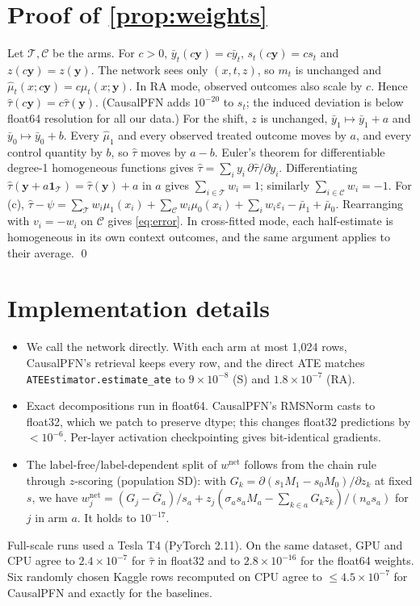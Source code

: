 \documentclass{article}
\newcommand{\that}{\hat\tau}
\begin{document}
\section{Proof of \cref{prop:weights}}\label{app:proof}
Let $\mathcal T, \mathcal C$ be the arms. For $c>0$, $\bar y_t(c\mathbf y) = c\bar y_t$, $s_t(c\mathbf y)=cs_t$ and $z(c\mathbf y)=z(\mathbf y)$. The network sees only $(x,t,z)$, so $m_t$ is unchanged and $\hat\mu_t(x; c\mathbf y) = c\hat\mu_t(x;\mathbf y)$. In RA mode, observed outcomes also scale by $c$. Hence $\that(c\mathbf y)=c\that(\mathbf y)$. (CausalPFN adds $10^{-20}$ to $s_t$; the induced deviation is below float64 resolution for all our data.) For the shift, $z$ is unchanged, $\bar y_1 \mapsto \bar y_1 + a$ and $\bar y_0\mapsto \bar y_0 + b$. Every $\hat\mu_1$ and every observed treated outcome moves by $a$, and every control quantity by $b$, so $\that$ moves by $a-b$. Euler's theorem for differentiable degree-1 homogeneous functions gives $\that = \sum_i y_i\,\partial\that/\partial y_i$. Differentiating $\that(\mathbf y + a\mathbf 1_{\mathcal T}) = \that(\mathbf y) + a$ in $a$ gives $\sum_{i\in\mathcal T}w_i = 1$; similarly $\sum_{i\in\mathcal C} w_i=-1$. For (c), $\that - \psi = \sum_{\mathcal T}w_i\mu_1(x_i) + \sum_{\mathcal C}w_i\mu_0(x_i) + \sum_i w_i\varepsilon_i - \bar\mu_1 + \bar\mu_0$. Rearranging with $v_i = -w_i$ on $\mathcal C$ gives \cref{eq:error}. In cross-fitted mode, each half-estimate is homogeneous in its own context outcomes, and the same argument applies to their average. \qed

\section{Implementation details}\label{app:impl}
\begin{itemize}
\item We call the network directly. With each arm at most 1{,}024 rows, CausalPFN's retrieval keeps every row, and the direct ATE matches \texttt{ATEEstimator.estimate\_ate} to $9\times10^{-8}$ (S) and $1.8\times10^{-7}$ (RA).
\item Exact decompositions run in float64. CausalPFN's RMSNorm casts to float32, which we patch to preserve dtype; this changes float32 predictions by $<10^{-6}$. Per-layer activation checkpointing gives bit-identical gradients.
\item The label-free/label-dependent split of $w^{\mathrm{net}}$ follows from the chain rule through $z$-scoring (population SD): with $G_k = \partial(s_1M_1 - s_0M_0)/\partial z_k$ at fixed $s$, we have $w^{\mathrm{net}}_j = (G_j - \bar G_a)/s_a + z_j(\sigma_a s_a M_a - \sum_{k\in a}G_kz_k)/(n_as_a)$ for $j$ in arm $a$. It holds to $10^{-17}$.
\end{itemize}
Full-scale runs used a Tesla T4 (PyTorch 2.11). On the same dataset, GPU and CPU agree to $2.4\times10^{-7}$ for $\that$ in float32 and to $2.8\times10^{-16}$ for the float64 weights. Six randomly chosen Kaggle rows recomputed on CPU agree to $\le 4.5\times10^{-7}$ for CausalPFN and exactly for the baselines.
\end{document}
